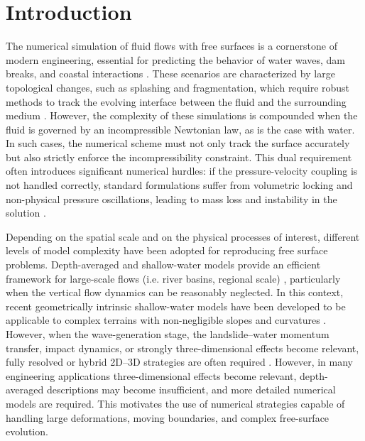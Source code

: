 \documentclass[11pt,english]{article}
\begin{document}



%
%

\section{Introduction}

    The numerical simulation of fluid flows with free surfaces is a cornerstone of modern engineering, essential for predicting the behavior of water waves, dam breaks, and coastal interactions \cite{violeau2016smoothed,cremonesi2020state}. These scenarios are characterized by large topological changes, such as splashing and fragmentation, which require robust methods to track the evolving interface between the fluid and the surrounding medium \cite{harlow1965numerical,hirt1981volume}. However, the complexity of these simulations is compounded when the fluid is governed by an incompressible Newtonian law, as is the case with water. In such cases, the numerical scheme must not only track the surface accurately but also strictly enforce the incompressibility constraint. This dual requirement often introduces significant numerical hurdles: if the pressure-velocity coupling is not handled correctly, standard formulations suffer from volumetric locking and non-physical pressure oscillations, leading to mass loss and instability in the solution \cite{zienkiewicz2005finite}.  

    Depending on the spatial scale and on the physical processes of interest, different levels of model complexity have been adopted for reproducing free surface problems. Depth-averaged and shallow-water models provide an efficient framework for large-scale flows (i.e. river basins, regional scale) \cite{QuecedoPastorHerreros2004,BosaPetti2011}, particularly when the vertical flow dynamics can be reasonably neglected. In this context, recent geometrically intrinsic shallow-water models have been developed to be applicable to complex terrains with non-negligible slopes and curvatures \cite{BachiniPutti2020,AbreuBachiniPerezPutti2023}. However, when the wave-generation stage, the landslide–water momentum transfer, impact dynamics, or strongly three-dimensional effects become relevant, fully resolved or hybrid 2D–3D strategies are often required \cite{CremonesiFrangiPerego2011,FranciCremonesiPeregoOnateCrosta2020a,FranciCremonesiPeregoOnateCrosta2020b,MasoFranciDePouplanaCornejoOnate2022,PanYamaguchiSuppasriMoriguchiTerada2021}. However, in many engineering applications three-dimensional effects become relevant, depth-averaged descriptions may become insufficient, and more detailed numerical models are required. This motivates the use of numerical strategies capable of handling large deformations, moving boundaries, and complex free-surface evolution.
\end{document}
